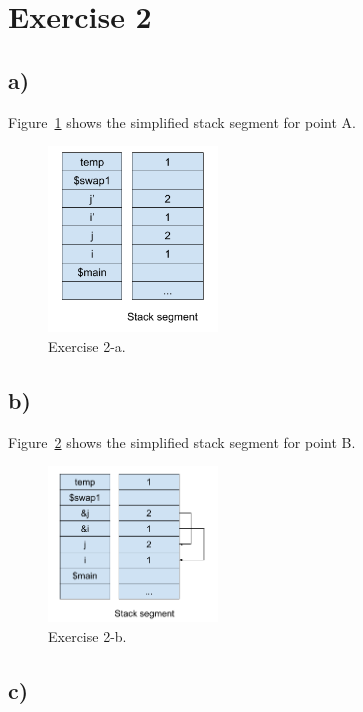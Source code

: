 \documentclass[a4paper,11pt]{report}
\begin{document}
\FloatBarrier

\section*{Exercise 2}

\subsection*{a)}

Figure~\ref{fig:ex2-a} shows the simplified stack segment for point A.

\begin{figure}[ht]
  \centering
  \includegraphics[width=0.4\textwidth]{figures/SOP_s05_ex2_a}
  \caption{\label{fig:ex2-a} Exercise 2-a.}
\end{figure}

\subsection*{b)}

Figure~\ref{fig:ex2-b} shows the simplified stack segment for point B.

\begin{figure}[ht]
  \centering
  \includegraphics[width=0.4\textwidth]{figures/SOP_s05_ex2_b}
  \caption{\label{fig:ex2-b} Exercise 2-b.}
\end{figure}

\subsection*{c)}
\end{document}
